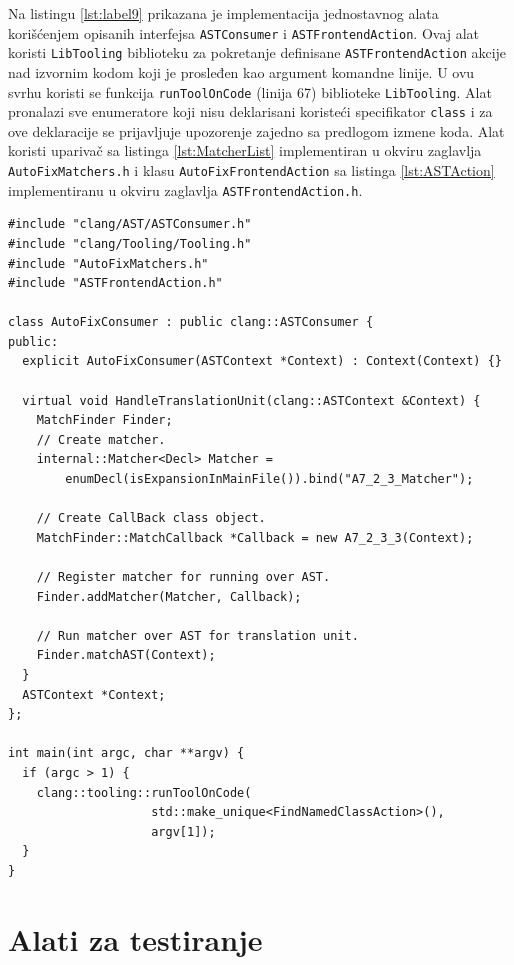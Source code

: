 \documentclass[12pt,oneside]{memoir}
\begin{document}
Na listingu \ref{lst:label9} prikazana je implementacija jednostavnog alata kori\v{s}\'{c}enjem opisanih interfejsa \texttt{ASTConsumer} i \texttt{ASTFrontendAction}. Ovaj alat koristi \texttt{LibTooling} biblioteku za pokretanje definisane \texttt{ASTFrontendAction} akcije nad izvornim kodom koji je prosleđen kao argument komandne linije. U ovu svrhu koristi se funkcija \texttt{runToolOnCode} (linija 67) biblioteke \texttt{LibTooling}. Alat pronalazi sve enumeratore koji nisu deklarisani koriste\'{c}i specifikator \texttt{class} i za ove deklaracije se prijavljuje upozorenje zajedno sa predlogom izmene koda. Alat koristi upariva\v{c} sa listinga \ref{lst:MatcherList} implementiran u okviru zaglavlja \texttt{AutoFixMatchers.h} i klasu \texttt{AutoFixFrontendAction} sa listinga \ref{lst:ASTAction} implementiranu u okviru zaglavlja \texttt{ASTFrontendAction.h}.
\\
\begin{lstlisting}[style=customc,  caption={Primer implementacije jednostavnog alata upotrebom interfejsa \texttt{ASTConsumer}, \texttt{ASTFrontendAction} i bibliotekom \texttt{libtooling}.}, label=lst:label9]
#include "clang/AST/ASTConsumer.h"
#include "clang/Tooling/Tooling.h"
#include "AutoFixMatchers.h"
#include "ASTFrontendAction.h"

class AutoFixConsumer : public clang::ASTConsumer {
public:
  explicit AutoFixConsumer(ASTContext *Context) : Context(Context) {}

  virtual void HandleTranslationUnit(clang::ASTContext &Context) {
    MatchFinder Finder;
    // Create matcher.
    internal::Matcher<Decl> Matcher =
        enumDecl(isExpansionInMainFile()).bind("A7_2_3_Matcher");

    // Create CallBack class object.
    MatchFinder::MatchCallback *Callback = new A7_2_3_3(Context);

    // Register matcher for running over AST.
    Finder.addMatcher(Matcher, Callback);

    // Run matcher over AST for translation unit.
    Finder.matchAST(Context);
  }
  ASTContext *Context;
};

int main(int argc, char **argv) {
  if (argc > 1) {
    clang::tooling::runToolOnCode(
                    std::make_unique<FindNamedClassAction>(),
                    argv[1]);
  }
}
\end{lstlisting}

\section{Alati za testiranje}
\end{document}
